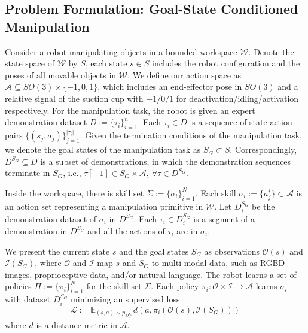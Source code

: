 \subsection{Problem Formulation: Goal-State Conditioned Manipulation}
Consider a robot manipulating objects in a bounded workspace $\mathcal W$.
Denote the state space of $\mathcal{W}$ by $S$, each state $s\in S$ includes the robot configuration and the poses of all movable objects in $\mathcal W$.
We define our action space as $\mathcal A\subseteq SO(3)\times\{-1,0,1\}$, which includes an end-effector pose in $SO(3)$ and a relative signal of the suction cup with $-1/0/1$ for deactivation/idling/activation respectively. 
For the manipulation task, the robot is given an expert demonstration dataset $D:=\{\tau_i\}_{i=1}^{n}$. 
Each $\tau_i \in D$ is a sequence of state-action pairs $\{(s_j, a_j)\}_{j=1}^{|\tau_i|}$.
Given the termination conditions of the manipulation task, we denote the goal states of the manipulation task as $S_G\subset S$. 
Correspondingly, $D^{S_G} \subseteq D$ is a subset of demonstrations, in which the demonstration sequences terminate in $S_G$, i.e., $\tau[-1]\in S_G \times \mathcal A, \ \forall \tau \in D^{S_G}$.

Inside the workspace, there is skill set $\Sigma:=\{\sigma_i\}_{i=1}^{N}$.
Each skill $\sigma_i:=\{a^i_{j}\}\subset \mathcal A$ is an action set representing a manipulation primitive in $\mathcal W$. 
Let $D^{S_G}_i$ be the demonstration dataset of $\sigma_i$ in $D^{S_G}$.
Each $\tau_i\in D^{S_G}_i$ is a segment of a demonstration in $D^{S_G}$ and all the actions of $\tau_i$ are in $\sigma_i$.

We present the current state $s$ and the goal states $S_G$ as observations $\mathcal O(s)$ and $\mathcal I(S_G)$, where $\mathcal O$ and $\mathcal I$ map $s$ and $S_G$ to multi-modal data, such as RGBD images, proprioceptive data, and/or natural language.
The robot learns a set of policies $\Pi :=\{\pi_i\}_{i=1}^{N}$ for the skill set $\Sigma$.
Each policy $\pi_i:\mathcal O \times \mathcal I \rightarrow \mathcal A$ learns $\sigma_i$ with dataset $D^{S_G}_i$ minimizing an supervised loss 
$$\mathcal L:=\mathbb{E}_{(s,a)\sim p_{D^{S_G}_i}} d(a,\pi_i(\mathcal O(s), \mathcal I(S_G)))$$ 
where $d$ is a distance metric in $\mathcal A$.

